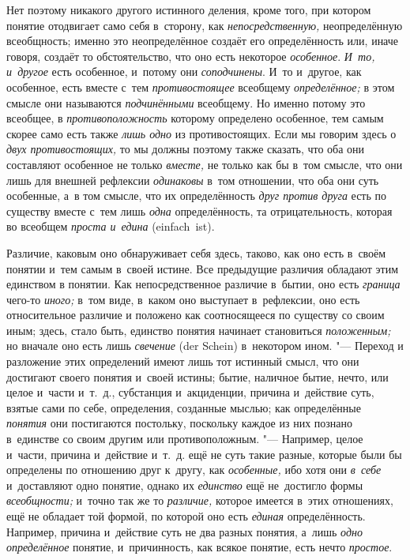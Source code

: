 \label{bkm:bm22a}Нет поэтому никакого другого истинного
деления, кроме того, при котором понятие отодвигает само себя в~сторону,
как {\em непосредственную,} неопределённую всеобщность; именно это
неопределённое создаёт его определённость или, иначе говоря,
создаёт то обстоятельство, что оно есть некоторое
{\em особенное}. {\em И~то, и~другое} есть особенное, и~потому они
{\em соподчинены}. И~то и~другое, как особенное, есть вместе с~тем
{\em противостоящее} всеобщему {\em определённое;} в
этом смысле они называются {\em подчинёнными}
всеобщему. Но именно потому это всеобщее, в {\em противоположность}
которому определено особенное, тем самым скорее само есть
также {\em лишь одно} из противостоящих. Если мы говорим здесь о
{\em двух противостоящих,}
то мы должны поэтому также сказать, что оба они составляют
особенное не только {\em вместе,} не только как бы в~том смысле,
что они лишь для внешней рефлексии {\em одинаковы}
в~том отношении, что оба они суть особенные, а~в том смысле,
что их определённость {\em друг против
друга} есть по существу вместе с~тем лишь {\em одна}
определённость, та отрицательность, которая во всеобщем
{\em проста и~едина} (einfach~ist).

Различие, каковым оно обнаруживает себя здесь, таково, как оно
есть в~своём понятии и~тем самым в~своей истине. Все предыдущие различия
обладают этим единством в
понятии. Как непосредственное
различие в~бытии, оно есть {\em граница} чего-то {\em иного;} в~том
виде, в~каком оно выступает в~рефлексии, оно есть относительное различие и
положено как соотносящееся по существу со своим иным; здесь, стало быть,
единство понятия начинает становиться {\em положенным;} но вначале оно есть
лишь {\em свечение} (der Schein) в~некотором ином. "--- Переход и
разложение этих определений имеют лишь тот истинный смысл, что они
достигают своего понятия и~своей истины; бытие, наличное бытие, нечто, или
целое и~части и~т.~д., субстанция и~акциденции, причина и~действие суть,
взятые сами по себе, определения, созданные мыслью; как определённые
{\em понятия} они
постигаются постольку, поскольку каждое из них познано в~единстве со своим
другим или противоположным. "--- Например, целое и~части,
причина и~действие и~т.~д. ещё не суть такие разные, которые были бы
определены по отношению друг к~другу, как {\em особенные,} ибо хотя они
{\em в~себе} и~доставляют одно понятие, однако их {\em единство} ещё
не~достигло формы {\em всеобщности;} и~точно так же то {\em различие,} которое
имеется в~этих отношениях, ещё не обладает той формой, по которой оно есть
{\em единая} определённость. Например, причина и~действие суть не два разных
понятия, а~лишь {\em одно определённое} понятие, и~причинность, как всякое
понятие, есть нечто {\em простое}.


